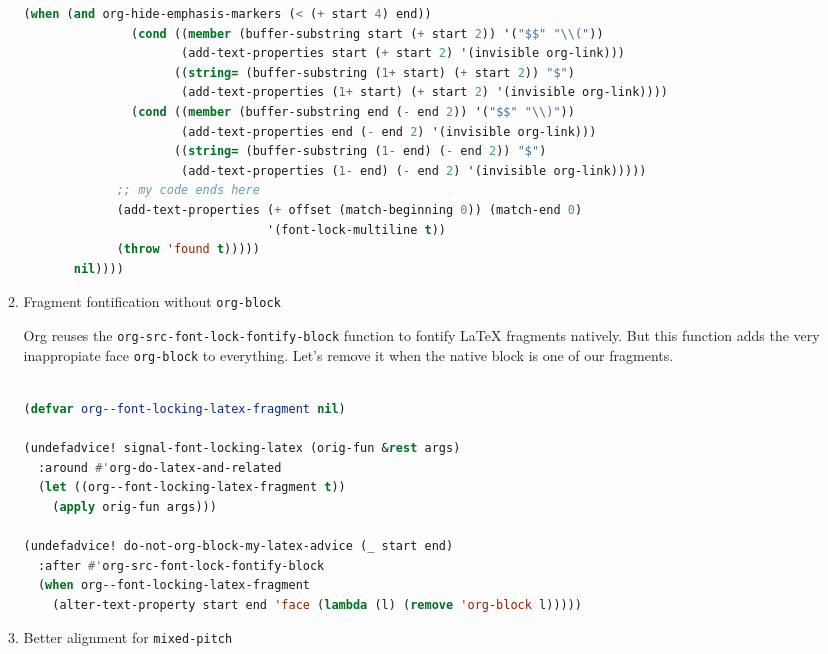 \documentclass[11pt]{article}
\begin{document}
\begin{enumerate}
\begin{enumerate}
\begin{lstlisting}[language=Lisp]
             (when (and org-hide-emphasis-markers (< (+ start 4) end))
               (cond ((member (buffer-substring start (+ start 2)) '("$$" "\\("))
                      (add-text-properties start (+ start 2) '(invisible org-link)))
                     ((string= (buffer-substring (1+ start) (+ start 2)) "$")
                      (add-text-properties (1+ start) (+ start 2) '(invisible org-link))))
               (cond ((member (buffer-substring end (- end 2)) '("$$" "\\)"))
                      (add-text-properties end (- end 2) '(invisible org-link)))
                     ((string= (buffer-substring (1- end) (- end 2)) "$")
                      (add-text-properties (1- end) (- end 2) '(invisible org-link)))))
             ;; my code ends here
             (add-text-properties (+ offset (match-beginning 0)) (match-end 0)
                                  '(font-lock-multiline t))
             (throw 'found t)))))
       nil))))
\end{lstlisting}
  \item Fragment fontification without \texttt{org-block}
  \label{sec:fragment-fontification-without-org-block}

  Org reuses the \lstinline|org-src-font-lock-fontify-block| function to fontify LaTeX fragments natively. But this function adds the very inappropiate face \lstinline|org-block| to everything. Let’s remove it when the native block is one of our fragments.

\begin{lstlisting}[language=Lisp]%! Someone please complete this list for me

(defvar org--font-locking-latex-fragment nil)

(undefadvice! signal-font-locking-latex (orig-fun &rest args)
  :around #'org-do-latex-and-related
  (let ((org--font-locking-latex-fragment t))
    (apply orig-fun args)))

(undefadvice! do-not-org-block-my-latex-advice (_ start end)
  :after #'org-src-font-lock-fontify-block
  (when org--font-locking-latex-fragment
    (alter-text-property start end 'face (lambda (l) (remove 'org-block l)))))
\end{lstlisting}
  \item Better alignment for \texttt{mixed-pitch}
  \label{sec:better-alignment-for-mixed-pitch}

  \begin{row}

\begin{figure}
  

\end{figure}
\end{row}
\end{enumerate}
\end{enumerate}
\end{document}
